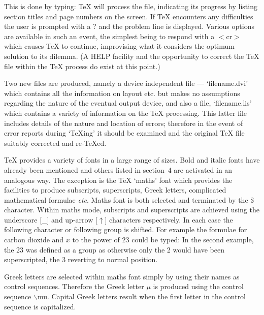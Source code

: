 
This is done by typing:
\medskip
{}
{\TeX} will process the file, indicating its progress by
listing section titles and page numbers on the screen. 
If {\TeX} encounters any difficulties the user is prompted with a ?
and the problem line is displayed.
Various options are available in such an event, the simplest being to
respond with a $<$cr$>$ which causes {\TeX} to continue, improvising what it
considers the optimum solution to its dilemma. 
(A HELP facility and the opportunity to
correct the {\TeX} file within the {\TeX} process do exist at this point.)
 
Two new files
are produced, namely a device independent file --- `filename.dvi' which
contains all the information on layout etc. but makes no assumptions 
regarding the nature of the eventual output device, and
also a file, `filename.lis' which contains a variety of information on 
the {\TeX} processing.
This latter file includes details of the nature and location of errors;
therefore in the event of error reports during `\TeX ing' it should be
examined and the original {\TeX} file suitably corrected and re-\TeX ed.




\nobreak
{}
\nobreak

{\TeX} provides a variety of fonts in a large range of sizes.
Bold and italic fonts have already been mentioned and others listed
in section~4 are activated in an analogous way.
The exception is the {\TeX} `maths' font which provides the facilities to
produce subscripts, superscripts, Greek letters, complicated mathematical 
formulae {\it etc}.
Maths font is both selected and terminated by the \$ character.
Within maths mode, subscripts and superscripts are achieved using 
the underscore [\_]
and up-arrow [$\uparrow$] characters respectively.
In each case the following character or following group is shifted.
For example the formulae for carbon dioxide and $x$ to the power of 23 could
be typed:
\medskip
{}
In the second example, the 23 was defined as a group as otherwise only
the 2 would have been superscripted, the 3 reverting to normal position.
 
Greek letters are selected within maths font simply by using their names 
as control sequences. 
Therefore the Greek letter $\mu$ is produced using the control 
sequence $\backslash$mu. 
Capital Greek letters result when the first letter in the control sequence
is capitalized.
 
